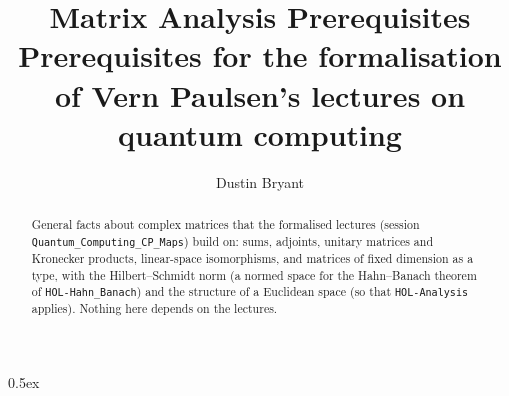 \documentclass[11pt,a4paper]{article}
\begin{document}
\title{Matrix Analysis Prerequisites\\[0.5em]
  \large Prerequisites for the formalisation of Vern Paulsen's lectures on quantum computing}
\author{Dustin Bryant}
\maketitle

\begin{abstract}
General facts about complex matrices that the formalised lectures (session
\texttt{Quantum\_Computing\_CP\_Maps}) build on: sums, adjoints, unitary matrices and Kronecker
products, linear-space isomorphisms, and matrices of fixed dimension as a type, with the
Hilbert--Schmidt norm (a normed space for the Hahn--Banach theorem of \texttt{HOL-Hahn\_Banach})
and the structure of a Euclidean space (so that \texttt{HOL-Analysis} applies).  Nothing here depends on the lectures.
\end{abstract}

\tableofcontents
\newpage

\parindent 0pt\parskip 0.5ex






\end{document}
